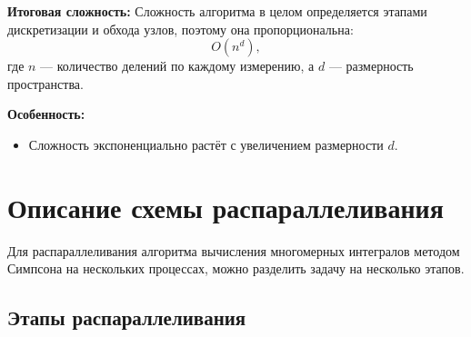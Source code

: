 \documentclass{report}
\begin{document}
\noindent \textbf{Итоговая сложность:}  
Сложность алгоритма в целом определяется этапами дискретизации и обхода узлов, поэтому она пропорциональна:
\[
O(n^d),
\]
где \( n \) — количество делений по каждому измерению, а \( d \) — размерность пространства.

\noindent \textbf{Особенность:}  
\begin{itemize}
    \item Сложность экспоненциально растёт с увеличением размерности \( d \).

\end{itemize}

\newpage
\section*{Описание схемы распараллеливания} 


Для распараллеливания алгоритма вычисления многомерных интегралов методом Симпсона на нескольких процессах, можно разделить задачу на несколько этапов.

\subsection*{Этапы распараллеливания}
\end{document}

